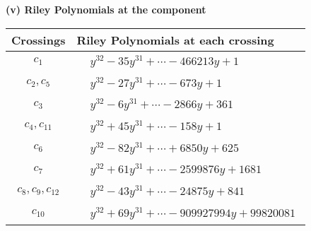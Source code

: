 \documentclass[1p]{elsarticle_modified}
\theoremstyle{definition}
\begin{document}
\newpage\renewcommand{\arraystretch}{1}
\flushleft \textbf{(v) Riley Polynomials at the component}\newline \\
\begin{tabular}{m{50pt}|m{274pt}}
Crossings & \hspace{64pt}Riley Polynomials at each crossing \\
\hline $$\begin{aligned}c_{1}\end{aligned}$$&$\begin{aligned}
&y^{32}-35 y^{31}+\cdots-466213 y+1
\end{aligned}$\\
\hline $$\begin{aligned}c_{2},c_{5}\end{aligned}$$&$\begin{aligned}
&y^{32}-27 y^{31}+\cdots-673 y+1
\end{aligned}$\\
\hline $$\begin{aligned}c_{3}\end{aligned}$$&$\begin{aligned}
&y^{32}-6 y^{31}+\cdots-2866 y+361
\end{aligned}$\\
\hline $$\begin{aligned}c_{4},c_{11}\end{aligned}$$&$\begin{aligned}
&y^{32}+45 y^{31}+\cdots-158 y+1
\end{aligned}$\\
\hline $$\begin{aligned}c_{6}\end{aligned}$$&$\begin{aligned}
&y^{32}-82 y^{31}+\cdots+6850 y+625
\end{aligned}$\\
\hline $$\begin{aligned}c_{7}\end{aligned}$$&$\begin{aligned}
&y^{32}+61 y^{31}+\cdots-2599876 y+1681
\end{aligned}$\\
\hline $$\begin{aligned}c_{8},c_{9},c_{12}\end{aligned}$$&$\begin{aligned}
&y^{32}-43 y^{31}+\cdots-24875 y+841
\end{aligned}$\\
\hline $$\begin{aligned}c_{10}\end{aligned}$$&$\begin{aligned}
&y^{32}+69 y^{31}+\cdots-909927994 y+99820081
\end{aligned}$\\
\hline
\end{tabular}\\~\\
\end{document}
